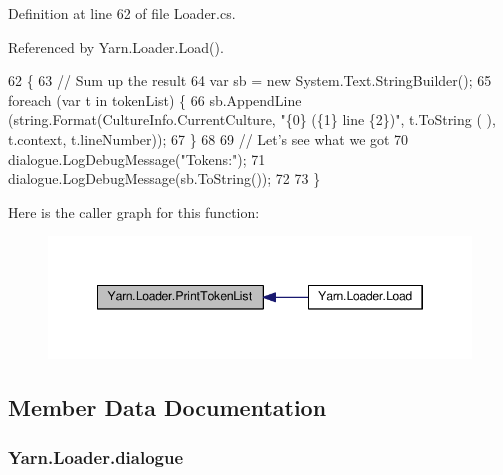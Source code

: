 Definition at line 62 of file Loader.\-cs.



Referenced by Yarn.\-Loader.\-Load().


\begin{DoxyCode}
62                                                           \{
63             \textcolor{comment}{// Sum up the result}
64             var sb = \textcolor{keyword}{new} System.Text.StringBuilder();
65             \textcolor{keywordflow}{foreach} (var t \textcolor{keywordflow}{in} tokenList) \{
66                 sb.AppendLine (string.Format(CultureInfo.CurrentCulture, \textcolor{stringliteral}{"\{0\} (\{1\} line \{2\})"}, t.ToString (
      ), t.context, t.lineNumber));
67             \}
68 
69             \textcolor{comment}{// Let's see what we got}
70             dialogue.LogDebugMessage(\textcolor{stringliteral}{"Tokens:"});
71             dialogue.LogDebugMessage(sb.ToString());
72 
73         \}
\end{DoxyCode}


Here is the caller graph for this function\-:
\nopagebreak
\begin{figure}[H]
\begin{center}
\leavevmode
\includegraphics[width=346pt]{a00133_a9321fce224021841ce6f70ca7fbe531b_icgraph}
\end{center}
\end{figure}




\subsection{Member Data Documentation}
\hypertarget{a00133_a89d1f29eba1c52c96c62a4cfe7859a1d}{
\subsubsection[{dialogue}]{ Yarn.\-Loader.\-dialogue\hspace{0.3cm}{\ttfamily [private]}}}\label{a00133_a89d1f29eba1c52c96c62a4cfe7859a1d}


